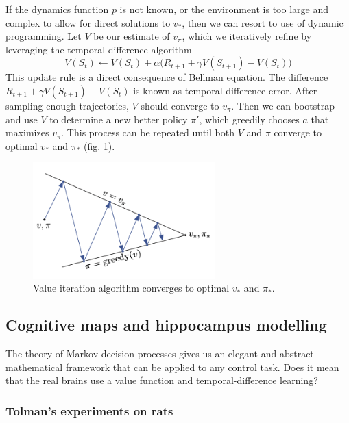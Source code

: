 \documentclass[12pt]{article}
\begin{document}
If the dynamics function $p$ is not known, or the environment is too large and complex to allow for direct solutions to $v_*$, then we can resort to use of dynamic programming. Let $V$ be our estimate of $v_\pi$, which we iteratively refine by leveraging the temporal difference algorithm
\[
V(S_{t}) \leftarrow V(S_{t}) + \alpha\big(R_{t+1}+\gamma V(S_{t+1}) - V(S_{t}) \big) 
\] 
This update rule is a direct consequence of Bellman equation. The difference $R_{t+1}+\gamma V(S_{t+1}) - V(S_{t})$ is known as temporal-difference error.
After sampling enough trajectories, $V$ should converge to $v_\pi$. Then we can bootstrap and use $V$ to determine a new better policy $\pi'$, which greedily chooses $a$ that maximizes $v_\pi$. This process can be repeated until both $V$ and $\pi$ converge to optimal $v_*$ and $\pi_*$ (fig. \ref{fig:policy_iteration}).
\begin{figure}[!htbp]
	\centering
	\includegraphics[width=7cm]{policy_iteration}
	\caption{Value iteration algorithm converges to optimal $v_*$ and $\pi_*$.}
	\label{fig:policy_iteration}
\end{figure}

\subsection{Cognitive maps and hippocampus modelling}

The theory of Markov decision processes gives us an elegant and abstract mathematical framework that can be applied to any control task. Does it mean that the real brains use a value function and temporal-difference learning?


\subsubsection{Tolman's experiments on rats}
\end{document}
